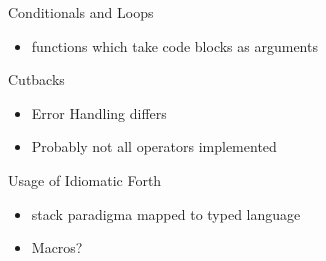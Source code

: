 \documentclass{beamer}
\begin{document}
\begin{frame}
    Conditionals and Loops

    \begin{itemize}
        \item functions which take code blocks as arguments
    \end{itemize}
\end{frame}


\begin{frame}
    Cutbacks
    \begin{itemize}
    \item Error Handling differs
    \item Probably not all operators implemented
    \end{itemize}
\end{frame}


\begin{frame}
    Usage of Idiomatic Forth
    \begin{itemize}
    \item stack paradigma mapped to typed language
    \item Macros?
    \end{itemize}
\end{frame}
\end{document}

